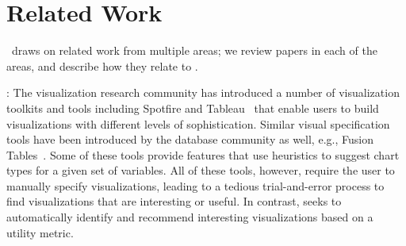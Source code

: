 

\section{Related Work}
\label{sec:related_work}
\SeeDB\ draws on related work from multiple areas;
we review papers in each of the areas, and describe how they relate to
\SeeDB. 

:
The visualization research community has introduced a number of
visualization toolkits and tools including Spotfire and 
Tableau~\cite{polaris, Ahlberg:1996:SIE:245882.245893} that enable
users to build visualizations with different levels of sophistication.
Similar visual specification tools have been introduced by the
database community as well, e.g., Fusion
Tables~\cite{DBLP:conf/sigmod/GonzalezHJLMSSG10}.
Some of these tools provide features that use heuristics to suggest
chart types for a given set of variables. 
All of these tools, however, require the user to manually specify
visualizations, leading to a tedious trial-and-error process to find
visualizations that are interesting or useful.
In contrast, \SeeDB seeks to automatically identify and 
recommend interesting visualizations based on a utility metric.





